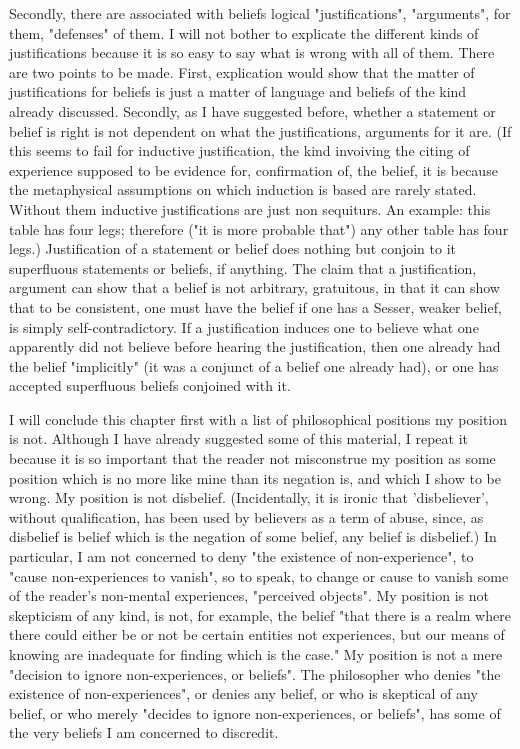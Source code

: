 \documentclass[10pt,twoside]{memoir}
\begin{document}
\begin{enumerate}
{Secondly, there are associated with beliefs logical "justifications", 
"arguments", for them, "defenses" of them. I will not bother to explicate 
the different kinds of justifications because it is so easy to say what is wrong 
with all of them. There are two points to be made. First, explication would 
show that the matter of justifications for beliefs is just a matter of language 
and beliefs of the kind already discussed. Secondly, as I have suggested 
before, whether a statement or belief is right is not dependent on what the 
justifications, arguments for it are. (If this seems to fail for inductive 
justification, the kind invoiving the citing of experience supposed to be 
evidence for, confirmation of, the belief, it is because the metaphysical 
assumptions on which induction is based are rarely stated. Without them 
inductive justifications are just non sequiturs. An example: this table has 
four legs; therefore ("it is more probable that") any other table has four 
legs.) Justification of a statement or belief does nothing but conjoin to it 
superfluous statements or beliefs, if anything. The claim that a justification, 
argument can show that a belief is not arbitrary, gratuitous, in that it can 
show that to be consistent, one must have the belief if one has a Sesser, 
weaker belief, is simply self-contradictory. If a justification induces one to 
believe what one apparently did not believe before hearing the justification, 
then one already had the belief "implicitly" (it was a conjunct of a belief 
one already had), or one has accepted superfluous beliefs conjoined with it. 

I will conclude this chapter first with a list of philosophical positions 
my position is not. Although I have already suggested some of this material, 
I repeat it because it is so important that the reader not misconstrue my 
position as some position which is no more like mine than its negation is, 
and which I show to be wrong. My position is not disbelief. (Incidentally, it 
is ironic that 'disbeliever', without qualification, has been used by believers 
as a term of abuse, since, as disbelief is belief which is the negation of some 
belief, any belief is disbelief.) In particular, I am not concerned to deny "the 
existence of non-experience", to "cause non-experiences to vanish", so to 
speak, to change or cause to vanish some of the reader's non-mental 
experiences, "perceived objects". My position is not skepticism of any kind, 
is not, for example, the belief "that there is a realm where there could either 
be or not be certain entities not experiences, but our means of knowing are 
inadequate for finding which is the case." My position is not a mere 
"decision to ignore non-experiences, or beliefs". The philosopher who denies 
"the existence of non-experiences", or denies any belief, or who is skeptical 
of any belief, or who merely "decides to ignore non-experiences, or beliefs", 
has some of the very beliefs I am concerned to discredit. 

}
\end{enumerate}
\end{document}
